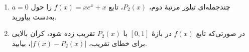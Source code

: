 \begin{enumerate}
	\item 
	چندجمله‌ای تیلور مرتبهٔ دوم، \(P_2(x)\)، تابع 
	\(f(x)=xe^x +x\)
	را حول
	\(a=0\)
	به‌دست بیاورید.
		\item
		در صورتی‌که تابع
		\(f(x)\)
		در بازهٔ 
		\([0,1]\)
		با 
		\(P_2(x)\) 
		تقریب زده شود، کران بالایی برای خطای تقریب،
		\(|f(x) -P_2(x)|\)، بیابید.
\end{enumerate}
